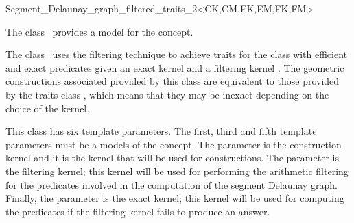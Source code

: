 


\begin{ccRefClass}
{Segment_Delaunay_graph_filtered_traits_2<CK,CM,EK,EM,FK,FM>}


\ccDefinition
  
The class \ccRefName\ provides a model for the
 concept.

The class \ccRefName\ uses the filtering technique \cite{cgal:bbp-iayed-01}
to achieve traits for the 
class with efficient and exact predicates given an exact
kernel  and a filtering kernel . The geometric
constructions associated provided by this class are equivalent
to those provided by the traits class
, which means that
they may be inexact depending on the choice of the  kernel.

This class has six template parameters. The first, third and fifth
template parameters must be a models of the  concept. The
parameter  is the construction kernel and it is the kernel
that will be used for constructions. The parameter  is the
filtering kernel; this kernel will be used for performing the
arithmetic filtering for the predicates involved in the computation of
the segment Delaunay graph. Finally, the parameter  is the
exact kernel; this kernel will be used for computing the predicates if
the filtering kernel fails to produce an answer.


\end{ccRefClass}
